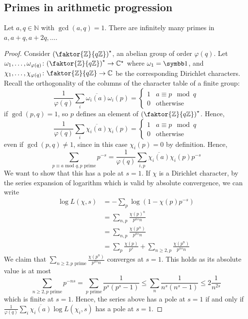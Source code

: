 \subsection{Primes in arithmetic progression}
\begin{theorem}[Dirichlet]
    Let \( a, q \in \mathbb N \) with \( \gcd(a,q) = 1 \).
    There are infinitely many primes in \( a, a + q, a + 2q, \dots \).
\end{theorem}
\begin{proof}
    Consider \( \qty(\faktor{\mathbb Z}{q\mathbb Z})^\star \), an abelian group of order \( \varphi(q) \).
    Let \( \omega_1, \dots, \omega_{\varphi(q)} \colon \qty(\faktor{\mathbb Z}{q\mathbb Z})^\star \to \mathbb C^\star \) where \( \omega_1 = \symbb 1 \), and \( \chi_1, \dots, \chi_{\varphi(q)} \colon \faktor{\mathbb Z}{q\mathbb Z} \to \mathbb C \) be the corresponding Dirichlet characters.
    Recall the orthogonality of the columns of the character table of a finite group:
    \[ \frac{1}{\varphi(q)} \sum_i \overline{\omega_i(a)} \omega_i(p) = \begin{cases}
        1 & a \equiv p \mod q \\
        0 & \text{otherwise}
    \end{cases} \]
    if \( \gcd(p, q) = 1 \), so \( p \) defines an element of \( \qty(\faktor{\mathbb Z}{q\mathbb Z})^\star \).
    Hence,
    \[ \frac{1}{\varphi(q)} \sum_i \overline{\chi_i(a)} \chi_i(p) = \begin{cases}
        1 & a \equiv p \mod q \\
        0 & \text{otherwise}
    \end{cases} \]
    even if \( \gcd(p, q) \neq 1 \), since in this case \( \chi_i(p) = 0 \) by definition.
    Hence,
    \[ \sum_{p \equiv a \text{ mod } q, p \text{ prime}} p^{-s} = \frac{1}{\varphi(q)} \sum_{i, p} \overline{\chi_i(a)} \chi_i(p) p^{-s} \]
    We want to show that this has a pole at \( s = 1 \).
    If \( \chi \) is a Dirichlet character, by the series expansion of logarithm which is valid by absolute convergence, we can write
    \begin{align*}
        \log L(\chi, s) &= -\sum_p \log(1 - \chi(p) p^{-s}) \\
        &= \sum_{n,p} \frac{\chi(p)^n}{p^{ns} n} \\
        &= \sum_{n,p} \frac{\chi(p^n)}{p^{ns} n} \\
        &= \sum_p \frac{\chi(p)}{p^s} + \sum_{n \geq 2, p} \frac{\chi(p^n)}{p^{ns} n}
    \end{align*}
    We claim that \( \sum_{n \geq 2, p \text{ prime}} \frac{\chi(p^n)}{p^{ns} n} \) converges at \( s = 1 \).
    This holds as its absolute value is at most
    \[ \sum_{n \geq 2, p \text{ prime}} p^{-ns} = \sum_{p \text{ prime}} \frac{1}{p^s(p^s - 1)} \leq \sum_n \frac{1}{n^s(n^s - 1)} \leq 2\frac{1}{n^{2s}} \]
    which is finite at \( s = 1 \).
    Hence, the series above has a pole at \( s = 1 \) if and only if \( \frac{1}{\varphi(q)} \sum_{i} \overline{\chi_i(a)} \log L(\chi_i, s) \) has a pole at \( s = 1 \).


\end{proof}
